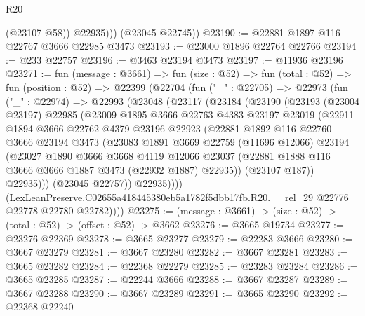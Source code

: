 \begin{lexlean}{R20}
\begin{coremodule}
              (@23107 @58))
            @22935)))
      (@23045 @22745))
@23190 := @22881 @1897 @116 @22767 @3666 @22985 @3473
@23193 := @23000 @1896 @22764 @22766
@23194 := @233 @22757
@23196 := @3463 @23194 @3473
@23197 := @11936 @23196
@23271 := fun (message : @3661) =>
  fun (size : @52) =>
  fun (total : @52) =>
  fun (position : @52) =>
  @22399
    (@22704
      (fun ("_" : @22705) =>
      @22973
        (fun ("_" : @22974) =>
        @22993
          (@23048
            (@23117
              (@23184
                (@23190
                  (@23193
                    (@23004 @23197)
                    @22985
                    (@23009
                      @1895
                      @3666
                      @22763
                      @4383
                      @23197
                      @23019
                      (@22911
                        @1894
                        @3666
                        @22762
                        @4379
                        @23196
                        @22923
                        (@22881
                          @1892
                          @116
                          @22760
                          @3666
                          @23194
                          @3473
                          (@23083
                            @1891
                            @3669
                            @22759
                            (@11696 @12066)
                            @23194
                            (@23027
                              @1890
                              @3666
                              @3668
                              @4119
                              @12066
                              @23037
                              (@22881 @1888 @116 @3666 @3666 @1887 @3473 (@22932 @1887) @22935))
                            (@23107 @187))
                          @22935)))
                    (@23045 @22757))
                  @22935))))
          (LexLeanPreserve.C02655a418445380eb5a1782f5dbb17fb.R20.__rel_29
            @22776
            @22778
            @22780
            @22782))))
@23275 := (message : @3661) -> (size : @52) -> (total : @52) -> (offset : @52) -> @3662
@23276 := @3665 @19734
@23277 := @23276 @22369
@23278 := @3665 @23277
@23279 := @22283 @3666
@23280 := @3667 @23279
@23281 := @3667 @23280
@23282 := @3667 @23281
@23283 := @3665 @23282
@23284 := @22368 @22279
@23285 := @23283 @23284
@23286 := @3665 @23285
@23287 := @22244 @3666
@23288 := @3667 @23287
@23289 := @3667 @23288
@23290 := @3667 @23289
@23291 := @3665 @23290
@23292 := @22368 @22240

\end{coremodule}
\end{lexlean}
